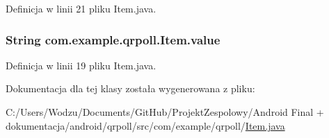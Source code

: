 Definicja w linii 21 pliku Item.\+java.

\hypertarget{classcom_1_1example_1_1qrpoll_1_1_item_abc0a6b74f1923ca042b9b9d3b48f014c}{
\subsubsection[{value}]{\setlength{\rightskip}{0pt plus 5cm}String com.\+example.\+qrpoll.\+Item.\+value\hspace{0.3cm}{\ttfamily [private]}}}\label{classcom_1_1example_1_1qrpoll_1_1_item_abc0a6b74f1923ca042b9b9d3b48f014c}


Definicja w linii 19 pliku Item.\+java.



Dokumentacja dla tej klasy została wygenerowana z pliku\+:\begin{DoxyCompactItemize}
\item 
C\+:/\+Users/\+Wodzu/\+Documents/\+Git\+Hub/\+Projekt\+Zespolowy/\+Android Final + dokumentacja/android/qrpoll/src/com/example/qrpoll/\hyperlink{_item_8java}{Item.\+java}\end{DoxyCompactItemize}
